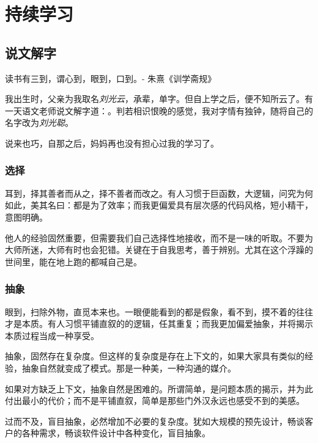 \chapter{持续学习} 
\label{ch:learning}


\section{说文解字}

\begin{content}

\begin{remark}
读书有三到，谓心到，眼到，口到。- 朱熹《训学斋规》
\end{remark}

我出生时，父亲为我取名\emph{刘光云}，承辈，单字。但自上学之后，便不知所云了。有一天语文老师说文解字道：。判若相识恨晚的感觉，我对字情有独钟，随将自己的名字改为\emph{刘光聪}。

说来也巧，自那之后，妈妈再也没有担心过我的学习了。

\subsection{选择}

耳到，择其善者而从之，择不善者而改之。有人习惯于巨函数，大逻辑，问究为何如此，美其名曰：都是为了效率；而我更偏爱具有层次感的代码风格，短小精干，意图明确。

他人的经验固然重要，但需要我们自己选择性地接收，而不是一味的听取。不要为大师所迷，大师有时也会犯错。关键在于自我思考，善于辨别。尤其在这个浮躁的世间里，能在地上跑的都喊自己是。

\subsection{抽象}

眼到，扫除外物，直觅本来也。一眼便能看到的都是假象，看不到，摸不着的往往才是本质。有人习惯平铺直叙的的逻辑，任其重复；而我更加偏爱抽象，并将揭示本质过程当成一种享受。

抽象，固然存在复杂度。但这样的复杂度是存在上下文的，如果大家具有类似的经验，抽象自然就变成了模式。那是一种美，一种沟通的媒介。

如果对方缺乏上下文，抽象自然是困难的。所谓简单，是问题本质的揭示，并为此付出最小的代价；而不是平铺直叙，简单是那些门外汉永远也感受不到的美感。

过而不及，盲目抽象，必然增加不必要的复杂度。犹如大规模的预先设计，畅谈客户的各种需求，畅谈软件设计中各种变化，盲目抽象。


\end{content}
